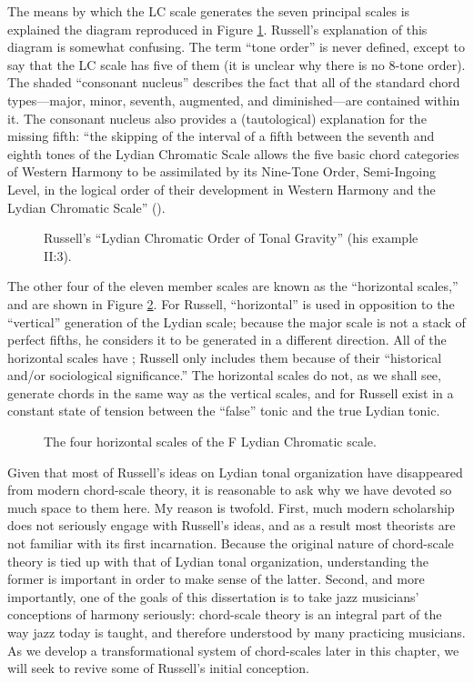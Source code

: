 The means by which the LC scale generates the seven principal scales is
explained the diagram reproduced in Figure \ref{lcc:lc-tonal-gravity}.
Russell's explanation of this diagram is somewhat confusing. The term ``tone
order'' is never defined, except to say that the LC scale has five of them (it
is unclear why there is no 8-tone order). The shaded ``consonant nucleus''
describes the fact that all of the standard chord types---major, minor,
seventh, augmented, and diminished---are contained within it. The
consonant nucleus also provides a (tautological) explanation for the missing
fifth: ``the skipping of the interval of a fifth between the seventh and
eighth tones of the Lydian Chromatic Scale allows the five basic chord
categories of Western Harmony to be assimilated by its Nine-Tone Order,
Semi-Ingoing Level, in the logical order of their development in Western
Harmony and the Lydian Chromatic Scale'' ().

\begin{figure}[tbp]
  \caption{Russell's ``Lydian Chromatic Order of Tonal Gravity'' (his example
    II:3).}
  \label{lcc:lc-tonal-gravity}
\end{figure}

The other four of the eleven member scales are known as the ``horizontal
scales,'' and are shown in Figure \ref{lcc:horizontal-scales}. For Russell,
``horizontal'' is used in opposition to the ``vertical'' generation of the
Lydian scale; because the major scale is not a stack of perfect fifths, he
considers it to be generated in a different direction. All of the horizontal
scales have \nat{}; Russell only includes them because of their ``historical
and/or sociological significance.'' The horizontal scales do not, as we shall
see, generate chords in the same way as the vertical scales, and for Russell
exist in a constant state of tension between the ``false'' tonic and the true
Lydian tonic.

\begin{figure}[tbp]
  \caption{The four horizontal scales of the F Lydian Chromatic scale.}
  \label{lcc:horizontal-scales}
\end{figure}

Given that most of Russell's ideas on Lydian tonal organization have
disappeared from modern chord-scale theory, it is reasonable to ask why we
have devoted so much space to them here. My reason is twofold. First, much
modern scholarship does not seriously engage with Russell's ideas, and as a
result most theorists are not familiar with its first incarnation. Because the
original nature of chord-scale theory is tied up with that of Lydian tonal
organization, understanding the former is important in order to make sense of
the latter. Second, and more importantly, one of the goals of this
dissertation is to take jazz musicians' conceptions of harmony seriously:
chord-scale theory is an integral part of the way jazz today is taught, and
therefore understood by many practicing musicians. As we develop a
transformational system of chord-scales later in this chapter, we will seek to
revive some of Russell's initial conception.

